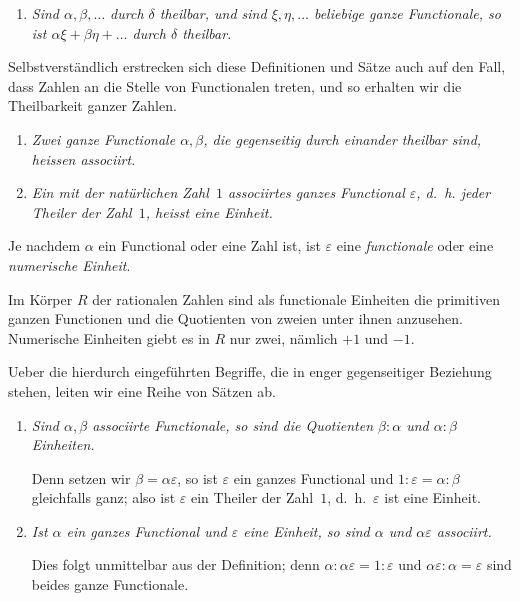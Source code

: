 \documentclass[12pt,a4paper]{article}
\theoremstyle{definition}
\begin{document}
\begin{enumerate}[label=\arabic*., resume]
\item \textit{Sind $\alpha,\beta,\dots$ durch $\delta$ theilbar, und sind $\xi,\eta,\dots$ beliebige ganze Functionale, so ist $\alpha\xi+\beta\eta+\dots$ durch $\delta$ theilbar.}
\end{enumerate}

Selbstverständlich erstrecken sich diese Definitionen und Sätze auch auf den Fall, dass Zahlen an die Stelle von Functionalen treten, und so erhalten wir die Theilbarkeit ganzer Zahlen.

\begin{enumerate}[label=\arabic*., resume]
\item \textit{Zwei ganze Functionale $\alpha,\beta$, die gegenseitig durch einander theilbar sind, heissen \emph{associirt}.}

\item \textit{Ein mit der natürlichen Zahl~$1$ associirtes ganzes Functional $\varepsilon$, d.~h. jeder Theiler der Zahl~$1$, heisst eine \emph{Einheit}.}
\end{enumerate}

Je nachdem $\alpha$ ein Functional oder eine Zahl ist, ist $\varepsilon$ eine \emph{functionale} oder eine \emph{numerische Einheit}.

Im Körper $R$ der rationalen Zahlen sind als functionale Einheiten die primitiven ganzen Functionen und die Quotienten von zweien unter ihnen anzusehen. Numerische Einheiten giebt es in $R$ nur zwei, nämlich $+1$ und $-1$.

Ueber die hierdurch eingeführten Begriffe, die in enger gegenseitiger Beziehung stehen, leiten wir eine Reihe von Sätzen ab.

\begin{enumerate}[label=\arabic*., resume]
\item \textit{Sind $\alpha,\beta$ associirte Functionale, so sind die Quotienten $\beta:\alpha$ und $\alpha:\beta$ Einheiten.}

Denn setzen wir $\beta=\alpha\varepsilon$, so ist $\varepsilon$ ein ganzes Functional und $1:\varepsilon=\alpha:\beta$ gleichfalls ganz; also ist $\varepsilon$ ein Theiler der Zahl~$1$, d.~h.\ $\varepsilon$ ist eine Einheit.

\item \textit{Ist $\alpha$ ein ganzes Functional und $\varepsilon$ eine Einheit, so sind $\alpha$ und $\alpha\varepsilon$ associirt.}

Dies folgt unmittelbar aus der Definition; denn $\alpha:\alpha\varepsilon=1:\varepsilon$ und $\alpha\varepsilon:\alpha=\varepsilon$ sind beides ganze Functionale.
\end{enumerate}
\end{document}
